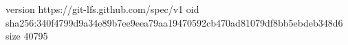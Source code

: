 version https://git-lfs.github.com/spec/v1
oid sha256:340f4799d9a34e89b7ee9eea79aa19470592cb470ad81079df8bb5ebdeb348d6
size 40795
